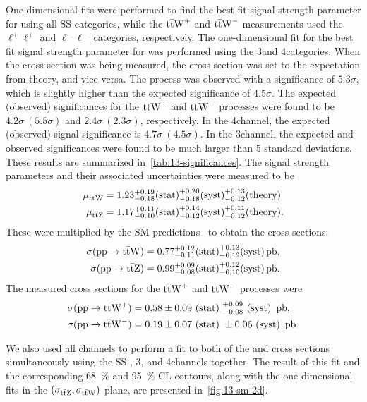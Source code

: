 One-dimensional fits were performed to find the best fit signal strength parameter for \ttW using
all SS \ttW categories, while the $\text{t}\bar{\text{t}}\text{W}^{+}$ and $\text{t}\bar{\text{t}}\text{W}^{-}$ measurements used the $\ell^+\ell^+$ and
$\ell^-\ell^-$ categories, respectively. The one-dimensional fit for the best fit signal strength
parameter for \ttZ was performed using the 3\lep and 4\lep categories. When the \ttW cross section
was being measured, the \ttZ cross section was set to the expectation from theory, and vice versa.
The \ttW process was observed with a significance of $5.3\sigma$, which is slightly higher than the
expected significance of $4.5\sigma$. The expected (observed) significances for the $\text{t}\bar{\text{t}}\text{W}^{+}$ and
$\text{t}\bar{\text{t}}\text{W}^{-}$ processes were found to be $4.2\sigma~(5.5\sigma)$ and $2.4\sigma~(2.3\sigma)$,
respectively. In the 4\lep \ttZ channel, the expected (observed) signal significance is
$4.7\sigma~(4.5\sigma)$. In the 3\lep \ttZ channel, the expected and observed significances were
found to be much larger than 5 standard deviations. These results are summarized
in~\cref{tab:13-significances}. The signal strength parameters and their associated uncertainties
were measured to be
\begin{align}
  \mu_{\text{t}\bar{\text{t}}\text{W}} &= 1.23^{+0.19}_{-0.18}\text{(stat)}^{+0.20}_{-0.18}\text{(syst)}^{+0.13}_{-0.12}\text{(theory)} \\
  \mu_{\text{t}\bar{\text{t}}\text{Z}} &= 1.17^{+0.11}_{-0.10}\text{(stat)}^{+0.14}_{-0.12}\text{(syst)}^{+0.11}_{-0.12}\text{(theory)}.
\end{align}
These were multiplied by the SM predictions~\cite{deFlorian:2016spz} to obtain the cross sections:
\begin{align}
  \sigma(\text{pp} \rightarrow \text{t}\bar{\text{t}}\text{W}) &= 0.77^{+0.12}_{-0.11}\text{(stat)}^{+0.13}_{-0.12}\text{(syst)}\,\text{pb}, \\
  \sigma(\text{pp} \rightarrow \text{t}\bar{\text{t}}\text{Z}) &= 0.99^{+0.09}_{-0.08}\text{(stat)}^{+0.12}_{-0.10}\text{(syst)}\,\text{pb}.
\end{align}
The measured cross sections for the $\text{t}\bar{\text{t}}\text{W}^{+}$ and $\text{t}\bar{\text{t}}\text{W}^{-}$ processes were
\begin{align}
  \sigma(\text{pp} \rightarrow \text{t}\bar{\text{t}}\text{W}^{+}) &= 0.58\pm{0.09}\text{ (stat) }^{+0.09}_{-0.08}\text{ (syst) }\,\text{pb}, \\
  \sigma(\text{pp} \rightarrow \text{t}\bar{\text{t}}\text{W}^{-}) &= 0.19\pm{0.07}\text{ (stat) }\pm{0.06}\text{ (syst) }\,\text{pb}.
\end{align}

We also used all channels to perform a fit to both of the \ttW and \ttZ cross sections
simultaneously using the SS \ttW, 3\lep \ttZ, and 4\lep \ttZ channels together. The result of this
fit and the corresponding \SI{68}{\percent} and \SI{95}{\percent} CL contours, along with the
one-dimensional fits in the $(\sigma_{\text{t}\bar{\text{t}}\text{Z}}, \sigma_{\text{t}\bar{\text{t}}\text{W}})$ plane, are presented
in~\cref{fig:13-sm-2d}.
\clearpage


